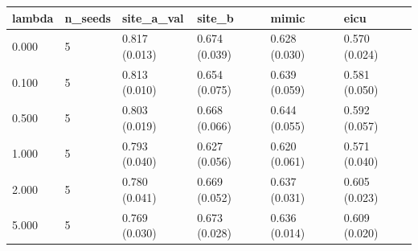 \begin{tabular}{llllll}
\hline
lambda & n\_seeds & site\_a\_val & site\_b & mimic & eicu \\
\hline
0.000 & 5 & 0.817 (0.013) & 0.674 (0.039) & 0.628 (0.030) & 0.570 (0.024) \\
0.100 & 5 & 0.813 (0.010) & 0.654 (0.075) & 0.639 (0.059) & 0.581 (0.050) \\
0.500 & 5 & 0.803 (0.019) & 0.668 (0.066) & 0.644 (0.055) & 0.592 (0.057) \\
1.000 & 5 & 0.793 (0.040) & 0.627 (0.056) & 0.620 (0.061) & 0.571 (0.040) \\
2.000 & 5 & 0.780 (0.041) & 0.669 (0.052) & 0.637 (0.031) & 0.605 (0.023) \\
5.000 & 5 & 0.769 (0.030) & 0.673 (0.028) & 0.636 (0.014) & 0.609 (0.020) \\
\hline
\end{tabular}
